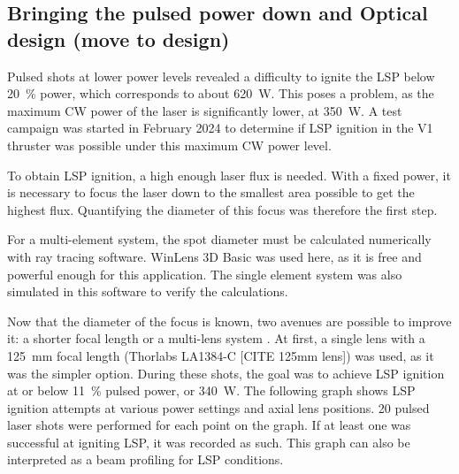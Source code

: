         \subsection{Bringing the pulsed power down and Optical design (move to design)} \label{sec:pulse_power_down_V1}
            
            Pulsed shots at lower power levels revealed a difficulty to ignite the LSP below \qty{20}{\%} power, which corresponds to about \qty{620}{W}. This poses a problem, as the maximum CW power of the laser is significantly lower, at \qty{350}{W}. A test campaign was started in February 2024 to determine if LSP ignition in the V1 thruster was possible under this maximum CW power level.
            
            To obtain LSP ignition, a high enough laser flux is needed. With a fixed power, it is necessary to focus the laser down to the smallest area possible to get the highest flux. Quantifying the diameter of this focus was therefore the first step. 


            For a multi-element system, the spot diameter must be calculated numerically with ray tracing software. WinLens 3D Basic \cite{QioptiqQShopFree} was used here, as it is free and powerful enough for this application. The single element system was also simulated in this software to verify the calculations.

            Now that the diameter of the focus is known, two avenues are possible to improve it: a shorter focal length or a multi-lens system \cite{LensTutorial}. At first, a single lens with a \qty{125}{mm} focal length (Thorlabs LA1384-C [CITE 125mm lens]) was used, as it was the simpler option. During these shots, the goal was to achieve LSP ignition at or below \qty{11}{\%} pulsed power, or \qty{340}{W}. The following graph shows LSP ignition attempts at various power settings and axial lens positions. 20 pulsed laser shots were performed for each point on the graph. If at least one was successful at igniting LSP, it was recorded as such. This graph can also be interpreted as a beam profiling for LSP conditions.
            
